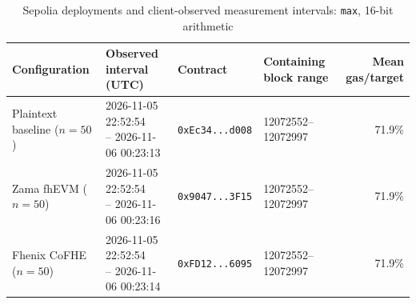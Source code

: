 \begin{table}[!t]
\caption{Sepolia deployments and client-observed measurement intervals: \texttt{max}, 16-bit arithmetic}
\label{tab:sepolia-client-intervals-classic-euint16-max}
\centering
\footnotesize
\setlength{\tabcolsep}{4pt}
\begin{tabular}{|l|l|l|l|r|}
\hline
\textbf{Configuration} &
\textbf{Observed interval (UTC)} &
\textbf{Contract} &
\textbf{Containing block range} &
\textbf{Mean gas/target} \\
\hline
Plaintext baseline (\(n=50\)) &
\shortstack[l]{2026-11-05 22:52:54 \\ -- 2026-11-06 00:23:13} &
\texttt{0xEc34...d008} &
12072552--12072997 &
71.9\% \\
\hline
Zama fhEVM (\(n=50\)) &
\shortstack[l]{2026-11-05 22:52:54 \\ -- 2026-11-06 00:23:16} &
\texttt{0x9047...3F15} &
12072552--12072997 &
71.9\% \\
\hline
Fhenix CoFHE (\(n=50\)) &
\shortstack[l]{2026-11-05 22:52:54 \\ -- 2026-11-06 00:23:14} &
\texttt{0xFD12...6095} &
12072552--12072997 &
71.9\% \\
\hline
\end{tabular}
\end{table}
